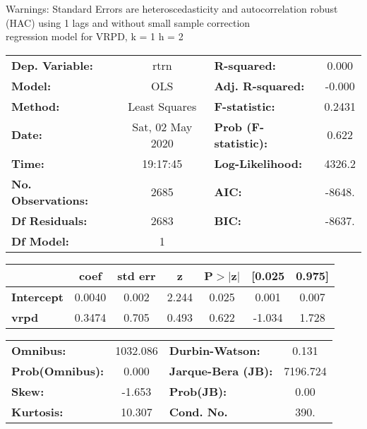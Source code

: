 Warnings: \newline
 [1] Standard Errors are heteroscedasticity and autocorrelation robust (HAC) using 1 lags and without small sample correction\\ 

regression model for VRPD, k = 1 h = 2\begin{center}
\begin{tabular}{lclc}
\toprule
\textbf{Dep. Variable:}    &       rtrn       & \textbf{  R-squared:         } &     0.000   \\
\textbf{Model:}            &       OLS        & \textbf{  Adj. R-squared:    } &    -0.000   \\
\textbf{Method:}           &  Least Squares   & \textbf{  F-statistic:       } &    0.2431   \\
\textbf{Date:}             & Sat, 02 May 2020 & \textbf{  Prob (F-statistic):} &    0.622    \\
\textbf{Time:}             &     19:17:45     & \textbf{  Log-Likelihood:    } &    4326.2   \\
\textbf{No. Observations:} &        2685      & \textbf{  AIC:               } &    -8648.   \\
\textbf{Df Residuals:}     &        2683      & \textbf{  BIC:               } &    -8637.   \\
\textbf{Df Model:}         &           1      & \textbf{                     } &             \\
\bottomrule
\end{tabular}
\begin{tabular}{lcccccc}
                   & \textbf{coef} & \textbf{std err} & \textbf{z} & \textbf{P$> |$z$|$} & \textbf{[0.025} & \textbf{0.975]}  \\
\midrule
\textbf{Intercept} &       0.0040  &        0.002     &     2.244  &         0.025        &        0.001    &        0.007     \\
\textbf{vrpd}      &       0.3474  &        0.705     &     0.493  &         0.622        &       -1.034    &        1.728     \\
\bottomrule
\end{tabular}
\begin{tabular}{lclc}
\textbf{Omnibus:}       & 1032.086 & \textbf{  Durbin-Watson:     } &    0.131  \\
\textbf{Prob(Omnibus):} &   0.000  & \textbf{  Jarque-Bera (JB):  } & 7196.724  \\
\textbf{Skew:}          &  -1.653  & \textbf{  Prob(JB):          } &     0.00  \\
\textbf{Kurtosis:}      &  10.307  & \textbf{  Cond. No.          } &     390.  \\
\bottomrule
\end{tabular}
\end{center}

